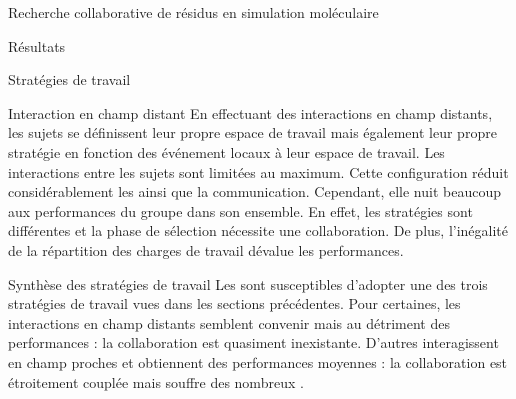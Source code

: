 \documentclass[myfrancais]{mythesis}
\begin{document}
\begin{mychapter}{Recherche collaborative de résidus en simulation moléculaire}
\begin{mysection}{Résultats}
\begin{mysubsection}{Stratégies de travail}
\begin{mysubsubsection}{Interaction en champ distant}
					En effectuant des interactions en champ distants, les sujets se définissent leur propre espace de travail mais également leur propre stratégie en fonction des événement locaux à leur espace de travail.
					Les interactions entre les sujets sont limitées au maximum.
					Cette configuration réduit considérablement les  ainsi que la communication.
					Cependant, elle nuit beaucoup aux performances du groupe dans son ensemble.
					En effet, les stratégies sont différentes et la phase de sélection nécessite une collaboration.
					De plus, l'inégalité de la répartition des charges de travail dévalue les performances.
				\end{mysubsubsection}
				\begin{mysubsubsection}{Synthèse des stratégies de travail}
					Les  sont susceptibles d'adopter une des trois stratégies de travail vues dans les sections précédentes.
					Pour certaines, les interactions en champ distants semblent convenir mais au détriment des performances : la collaboration est quasiment inexistante.
					D'autres  interagissent en champ proches et obtiennent des performances moyennes : la collaboration est étroitement couplée mais souffre des nombreux .


\end{mysubsubsection}
\end{mysubsection}
\end{mysection}
\end{mychapter}
\end{document}
